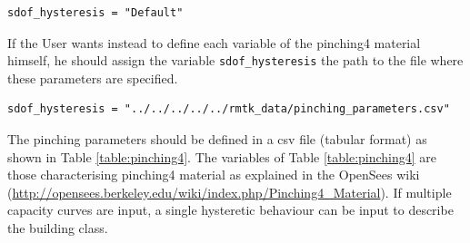 \begin{Verbatim}[frame=single, commandchars=\\\{\}, samepage=true]
sdof_hysteresis = "Default"
\end{Verbatim}

If the User wants instead to define each variable of the pinching4 material himself, he should assign the variable \verb=sdof_hysteresis= the path to the file where these parameters are specified.

\begin{Verbatim}[frame=single, commandchars=\\\{\}, samepage=true]
sdof_hysteresis = "../../../../../rmtk_data/pinching_parameters.csv"
\end{Verbatim}

The pinching parameters should be defined in a csv file (tabular format) as shown in Table \ref{table:pinching4}. The variables of Table \ref{table:pinching4} are those characterising pinching4 material as explained in the OpenSees wiki (\href{http://opensees.berkeley.edu/wiki/index.php/Pinching4_Material}{http://opensees.berkeley.edu/wiki/index.php/Pinching4\_Material}). If multiple capacity curves are input, a single hysteretic behaviour can be input to describe the building class.\\


